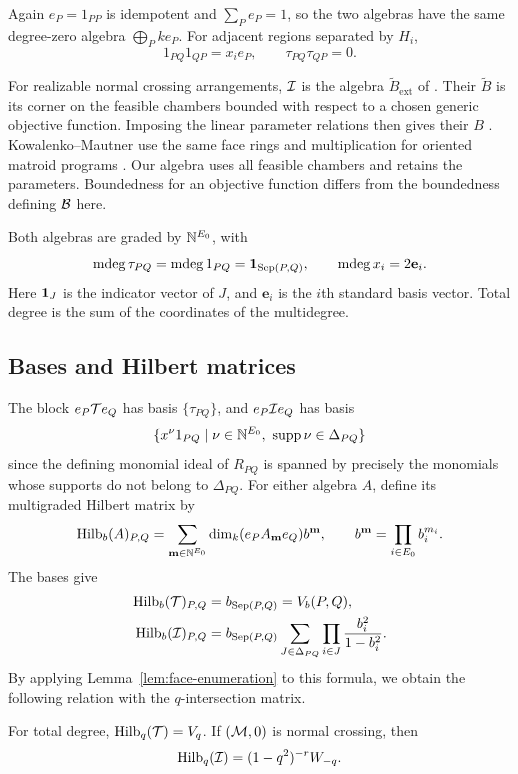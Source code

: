 Again $e_P=1_{PP}$ is idempotent and $\sum_Pe_P=1$, so the two
algebras have the same degree-zero algebra $\bigoplus_Pke_P$.
For adjacent regions separated by $H_i$,
\[
 1_{PQ}1_{QP}=x_ie_P,\qquad \tau_{PQ}\tau_{QP}=0.
\]
\begin{remark}
For realizable normal crossing arrangements, $\mathcal I$ is the algebra
$\widetilde B_{\mathrm{ext}}$ of \cite[Section 4.5]{BLPWgale}.
Their $\widetilde B$ is its corner on the feasible chambers bounded
with respect to a chosen generic objective function. Imposing the
linear parameter relations then gives their $B$
\cite[Definition 4.3 and Remark 4.5]{BLPWgale}.
Kowalenko--Mautner use the same face rings and multiplication for
oriented matroid programs \cite[Definition 5.9]{KowalenkoMautner}.
Our algebra uses all feasible chambers and retains the parameters.
Boundedness for an objective function differs from the boundedness
defining $\mathcal B$ here.
\end{remark}

Both algebras are graded by $\mathbb N^{E_0}$, with
\[
 \operatorname{mdeg}\tau_{PQ}=\operatorname{mdeg}1_{PQ}=\mathbf 1_{\operatorname{Sep}(P,Q)},\qquad
 \operatorname{mdeg} x_i=2\mathbf e_i.
\]
Here $\mathbf 1_J$ is the indicator vector of $J$, and $\mathbf e_i$ is
the $i$th standard basis vector. Total degree is the sum of the
coordinates of the multidegree.

\subsection{Bases and Hilbert matrices}
The block $e_P\mathcal T e_Q$ has basis $\{\tau_{PQ}\}$, and
$e_P\mathcal I e_Q$ has basis
\[
 \{x^\nu1_{PQ}\mid\nu\in\NN^{E_0},\ \supp\nu\in\Delta_{PQ}\}
\]
since the defining monomial ideal of $R_{PQ}$ is spanned by precisely
the monomials whose supports do not belong to $\Delta_{PQ}$.
For either algebra $A$, define its multigraded Hilbert matrix by
\[
 \operatorname{Hilb}_b(A)_{P,Q}=\sum_{\mathbf m\in\mathbb N^{E_0}}
       \dim_k(e_PA_{\mathbf m}e_Q)b^{\mathbf m},
 \qquad b^{\mathbf m}=\prod_{i\in E_0}b_i^{m_i}.
\]
The bases give
\begin{align*}
 \operatorname{Hilb}_b(\mathcal T)_{P,Q}&=b_{\operatorname{Sep}(P,Q)}=V_b(P,Q),\\
 \operatorname{Hilb}_b(\mathcal I)_{P,Q}&=b_{\operatorname{Sep}(P,Q)}
    \sum_{J\in\Delta_{PQ}}\prod_{i\in J}\frac{b_i^2}{1-b_i^2}.
\end{align*}
By applying Lemma~\ref{lem:face-enumeration} to this formula, we obtain the following relation with the $q$-intersection matrix.
\begin{corollary}\label{cor:graded-hilbert}
For total degree, $\operatorname{Hilb}_q(\mathcal T)=V_q$. If $(\mathcal M,0)$ is normal crossing, then
\[
 \operatorname{Hilb}_q(\mathcal I)=(1-q^2)^{-r}W_{-q}.
\]
\end{corollary}
